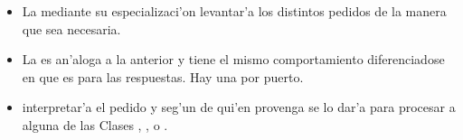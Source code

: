 \begin{itemize}
\item La  mediante su especializaci'on levantar'a los distintos pedidos de la manera que sea necesaria.

\item La  es an'aloga a la anterior y tiene el mismo comportamiento diferenciadose en que es para las respuestas. Hay una por puerto.

\item {} interpretar'a el pedido y seg'un de qui'en provenga se lo dar'a para procesar a alguna de las Clases , ,  o . 

\end{itemize}



